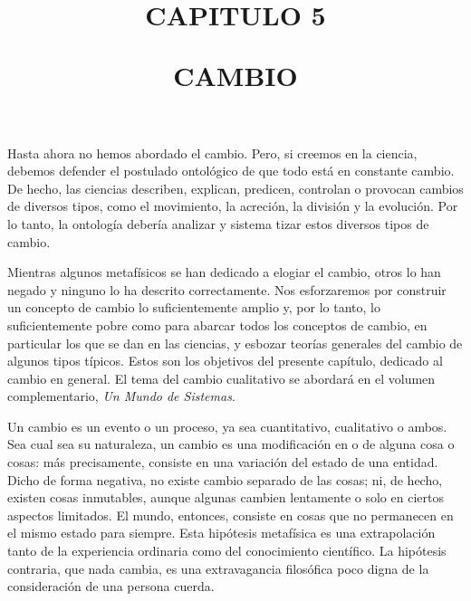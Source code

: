 \documentclass[11pt]{article}
\title{
  \normalsize CAPITULO 5
  \vspace{0.5cm}
  \begin{center}
    \large CAMBIO
  \end{center}
  }
\date{}
\begin{document}
\maketitle
\thispagestyle{empty}
\vspace{-1cm}

\begin{justifying}
  \noindent 
  Hasta ahora no hemos abordado el cambio. Pero, si creemos en la ciencia, debemos defender el postulado ontológico de que todo 
  está en constante cambio. De hecho, las ciencias describen, explican, predicen, 
  controlan o provocan cambios de diversos tipos, como el movimiento, la acreción, 
  la división y la evolución. Por lo tanto, la ontología debería analizar y sistema tizar estos diversos tipos de cambio.

  Mientras algunos metafísicos se han dedicado a elogiar el cambio, otros lo han negado y ninguno lo ha descrito correctamente. Nos esforzaremos por construir un concepto de cambio lo suficientemente amplio y, por lo tanto, lo suficientemente pobre como para abarcar todos los conceptos de cambio, en particular los que se dan en las ciencias, y esbozar teorías generales del cambio de algunos tipos típicos. Estos son los objetivos del presente capítulo, dedicado al cambio en general. El tema del cambio cualitativo se abordará en el volumen complementario, \textit{Un Mundo de Sistemas}.

  Un cambio es un evento o un proceso, ya sea cuantitativo, cualitativo o ambos. Sea cual sea su naturaleza, un cambio es una modificación en o de alguna cosa o cosas: más precisamente, consiste en una variación del estado de una entidad. Dicho de forma negativa, no existe cambio separado de las cosas; ni, de hecho, existen cosas inmutables, aunque algunas cambien lentamente o solo en ciertos aspectos limitados. El mundo, entonces, consiste en cosas que no permanecen en el mismo estado para siempre. Esta hipótesis metafísica es una extrapolación tanto de la experiencia ordinaria como del conocimiento científico. La hipótesis contraria, que nada cambia, es una extravagancia filosófica poco digna de la consideración de una persona cuerda.

\end{justifying}










\printbibliography
\end{document}
